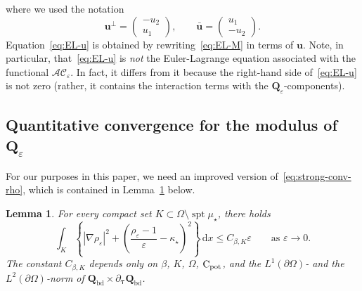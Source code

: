 \documentclass[a4paper, 11pt, twoside, leqno]{article}
\newtheorem{lemma}[theorem]{Lemma}
\theoremstyle{definition}              %
\theoremstyle{remark}                  %
\DeclareMathOperator{\spt}{spt}                                     %
\newcommand{\abs}[1]{\left| #1 \right|}                             %
\renewcommand{\d}{\mathrm{d}}
\newcommand{\Q}{\mathbf{Q}}
\renewcommand{\u}{\mathbf{u}}
\newcommand{\eps}{\varepsilon}
\newcommand{\Cpot}{{\rm C}_{\rm pot}}
\newcommand{\ttau}{{\boldsymbol{\tau}}}
\newcommand{\Qb}{\Q_{\mathrm{bd}}}
\begin{document}
where we used the notation
\[
   \u^\perp = 
   \begin{pmatrix}
    -u_2 \\
     u_1
   \end{pmatrix}, \qquad 
   \bar{\u} = 
      \begin{pmatrix}
     u_1 \\
     -u_2
   \end{pmatrix}.
\]
Equation~\eqref{eq:EL-u} is obtained by rewriting~\eqref{eq:EL-M} in terms of $\u$. 
Note, in particular, that~\eqref{eq:EL-u} is \emph{not} the Euler-Lagrange 
equation associated with the functional $\mathcal{AC}_\eps$. 
In fact, it differs from it because the right-hand side of~\eqref{eq:EL-u} 
is not zero (rather, it contains the interaction terms with the $\Q_\eps$-components).


\subsection{Quantitative convergence for the modulus of ${\Q_\eps}$}
\label{sec:conv-rho-eps}

For our purposes in this paper, we need an improved version of~\eqref{eq:strong-conv-rho}, 
which is contained in Lemma~\ref{lemma:improved-decay-rho} below. 
\begin{lemma}\label{lemma:improved-decay-rho}
    For every compact set $K \subset \Omega \setminus \spt\mu_\star$, 
    there holds
    \begin{equation}\label{eq:improved-decay-rho}
        \int_K \left\{ \abs{\nabla \rho_\eps}^2 + \left(\frac{\rho_\eps -1}{\eps} - \kappa_\star \right)^2 \right\}\,{\d}x \leq C_{\beta,K} \eps \qquad \mbox{as } \eps \to 0.
    \end{equation}
The constant $C_{\beta,K}$ depends only on $\beta$, $K$, $\Omega$, $\Cpot$, and 
the $L^1(\partial\Omega)$- and the $L^2(\partial\Omega)$-norm of 
$\Qb \times \partial_{\ttau} \Qb$.
\end{lemma}
\end{document}
